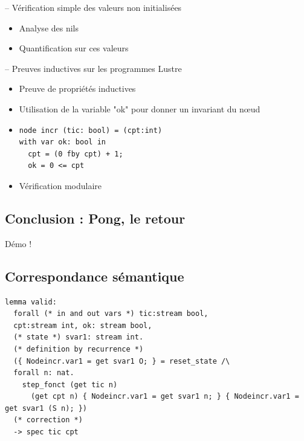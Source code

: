 \documentclass[11pt,usenames,dvipsnames]{beamer}
\begin{document}
\begin{frame}{-- Vérification simple des valeurs non initialisées}
	\begin{itemize}
		\item Analyse des nils
		\item Quantification sur ces valeurs
	\end{itemize}
\end{frame}


\begin{frame}[fragile]{-- Preuves inductives sur les programmes Lustre}
	\begin{itemize}
		\item Preuve de propriétés inductives
		\item Utilisation de la variable "ok" pour donner un invariant du nœud
		\item
		  \begin{lstlisting}[language=minils]
node incr (tic: bool) = (cpt:int)
with var ok: bool in
  cpt = (0 fby cpt) + 1;
  ok = 0 <= cpt\end{lstlisting}
		\item Vérification modulaire
	\end{itemize}
\end{frame}

\subsection{Conclusion : Pong, le retour}
\begin{frame}{\null}
\centering \Large Démo !
\end{frame}



\appendix

\subsection{Correspondance sémantique}
\begin{frame}[fragile]{\null}
  \begin{lstlisting}[language=why3]
lemma valid:
  forall (* in and out vars *) tic:stream bool,
  cpt:stream int, ok: stream bool,
  (* state *) svar1: stream int.
  (* definition by recurrence *)
  ({ Nodeincr.var1 = get svar1 O; } = reset_state /\
  forall n: nat.
    step_fonct (get tic n)
      (get cpt n) { Nodeincr.var1 = get svar1 n; } { Nodeincr.var1 = get svar1 (S n); })
  (* correction *)
  -> spec tic cpt\end{lstlisting}
\end{frame}
\end{document}

